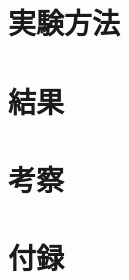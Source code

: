 \documentclass[a4paper,11pt]{jsarticle}
\begin{document}
\section{実験方法}

\section{結果}

\section{考察}

\section{付録}
\end{document}
